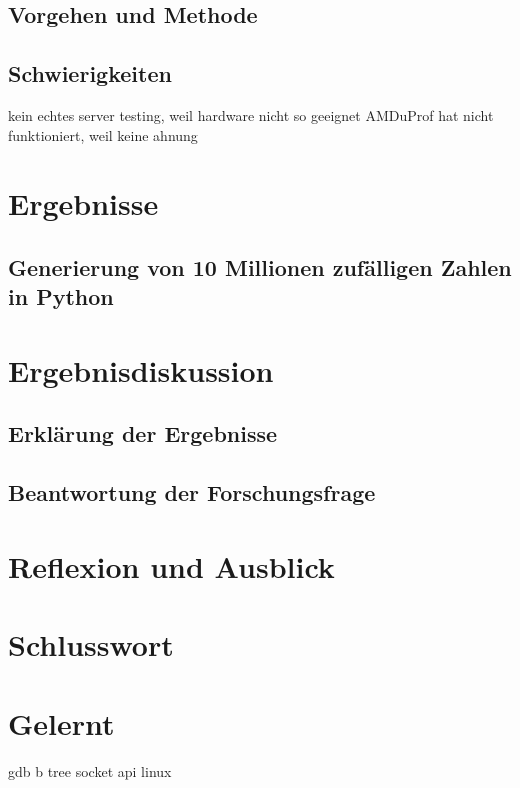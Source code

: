 \documentclass[11pt,a4paper]{article}
\begin{document}
\subsection{Vorgehen und Methode}

\subsection{Schwierigkeiten}

kein echtes server testing, weil hardware nicht so geeignet
AMDuProf hat nicht funktioniert, weil keine ahnung

\section{Ergebnisse}

\subsection{Generierung von 10 Millionen zufälligen Zahlen in Python}

\clearpage

\section{Ergebnisdiskussion}

\subsection{Erklärung der Ergebnisse}

\subsection{Beantwortung der Forschungsfrage}

\section{Reflexion und Ausblick}

\section{Schlusswort}

\section{Gelernt}
gdb
b tree
socket api linux
\end{document}
